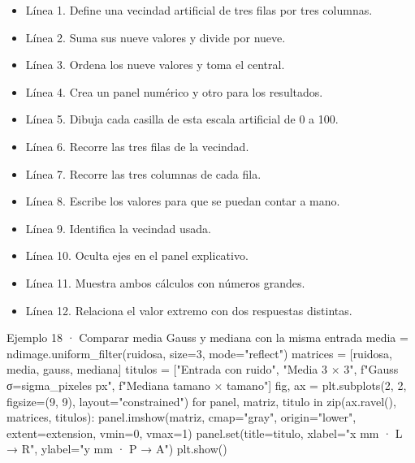 \begin{itemize}

\item Línea 1. Define una vecindad artificial de tres filas por tres columnas.

\item Línea 2. Suma sus nueve valores y divide por nueve.

\item Línea 3. Ordena los nueve valores y toma el central.

\item Línea 4. Crea un panel numérico y otro para los resultados.

\item Línea 5. Dibuja cada casilla de esta escala artificial de 0 a 100.

\item Línea 6. Recorre las tres filas de la vecindad.

\item Línea 7. Recorre las tres columnas de cada fila.

\item Línea 8. Escribe los valores para que se puedan contar a mano.

\item Línea 9. Identifica la vecindad usada.

\item Línea 10. Oculta ejes en el panel explicativo.

\item Línea 11. Muestra ambos cálculos con números grandes.

\item Línea 12. Relaciona el valor extremo con dos respuestas distintas.

\end{itemize}

\begin{Codigo}{Ejemplo 18 · Comparar media Gauss y mediana con la misma entrada}
media = ndimage.uniform_filter(ruidosa, size=3, mode="reflect")
matrices = [ruidosa, media, gauss, mediana]
titulos = ["Entrada con ruido", "Media 3 × 3", f"Gauss σ={sigma_pixeles} px", f"Mediana {tamano} × {tamano}"]
fig, ax = plt.subplots(2, 2, figsize=(9, 9), layout="constrained")
for panel, matriz, titulo in zip(ax.ravel(), matrices, titulos):
    panel.imshow(matriz, cmap="gray", origin="lower", extent=extension, vmin=0, vmax=1)
    panel.set(title=titulo, xlabel="x mm · L → R", ylabel="y mm · P → A")
plt.show()
\end{Codigo}

